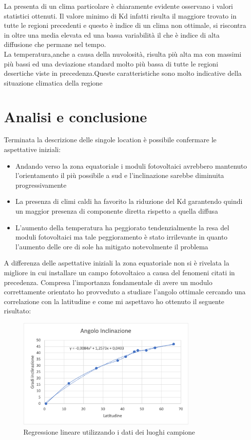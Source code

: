 La presenta di un clima particolare è chiaramente evidente osservano i valori statistici ottenuti. Il valore minimo di Kd infatti risulta il maggiore trovato in tutte le regioni precedenti e questo è indice di un clima non ottimale, si riscontra in oltre una media elevata ed una bassa variabilità il che è indice di alta diffusione che permane nel tempo.\\
La temperatura,anche a causa della nuvolosità, risulta più alta ma con massimi più bassi ed una deviazione standard molto più bassa di tutte le regioni desertiche viste in precedenza.Queste caratteristiche sono molto indicative della situazione climatica della regione\\
\section{Analisi e conclusione}
Terminata la descrizione delle singole location è possibile confermare le aspettative iniziali:
\begin{itemize}
    \item Andando verso la zona equatoriale i moduli fotovoltaici avrebbero mantenuto l'orientamento il più possibile a sud e l'inclinazione sarebbe diminuita progressivamente
    \item La presenza di climi caldi ha favorito la riduzione del Kd garantendo quindi un maggior presenza di componente diretta rispetto a quella diffusa
    \item L'aumento della temperatura ha peggiorato tendenzialmente la resa del moduli fotovoltaici ma tale peggioramento è stato irrilevante in quanto l'aumento delle ore di sole ha mitigato notevolmente il problema
\end{itemize}
A differenza delle aspettative iniziali la zona equatoriale non si è rivelata la migliore in cui installare un campo fotovoltaico a causa del fenomeni citati in precedenza.
Compresa l'importanza fondamentale di avere un modulo correttamente orientato ho provveduto a studiare l'angolo ottimale cercando una correlazione con la latitudine e come mi aspettavo ho ottenuto il seguente risultato:
\begin{figure}[H]
    \centering
    \includegraphics[width=0.8\textwidth]{res/cap 5/regressione lineare}
    \caption{Regressione lineare utilizzando i dati dei luoghi campione}
\end{figure}\noindent
